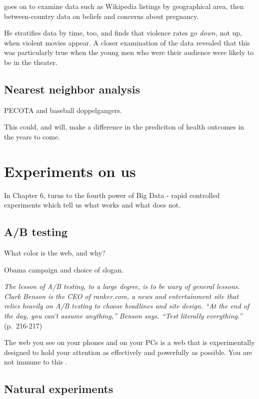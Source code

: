 \documentclass[]{book}
\theoremstyle{definition}
\theoremstyle{definition}
\theoremstyle{definition}
\theoremstyle{remark}
\begin{document}
\citet{stephens2017everybody} goes on to examine data such as Wikipedia
listings by geographical area, then between-country data on beliefs and
concerns about pregnancy.

He stratifies data by time, too, and finds that violence rates go
\emph{down,} not up, when violent movies appear. A closer examination of
the data revealed that this was particularly true when the young men who
were their audience were likely to be in the theater.

\section{Nearest neighbor analysis}\label{nearest-neighbor-analysis}

PECOTA and baseball doppelgangers.

This could, and will, make a difference in the prediciton of health
outcomes in the years to come.

\chapter{Experiments on us}\label{experiments-on-us}

In Chapter 6, \citet{stephens2017everybody} turns to the fourth power of
Big Data - rapid controlled experiments which tell us what works and
what does not.

\section{A/B testing}\label{ab-testing}

What color is the web, and why?

Obama campaign and choice of slogan.

\emph{The lesson of A/B testing, to a large degree, is to be wary of
general lessons. Clark Benson is the CEO of ranker.com, a news and
entertainment site that relies heavily on A/B testing to choose
headlines and site design. ``At the end of the day, you can't assume
anything,'' Benson says. ``Test literally everything.''} (p.~216-217)

The web you see on your phones and on your PCs is a web that is
experimentally designed to hold your attention as effectively and
powerfully as possible. You are not immune to this
\citep{alter2017irresistible}.

\section{Natural experiments}\label{natural-experiments}
\end{document}
